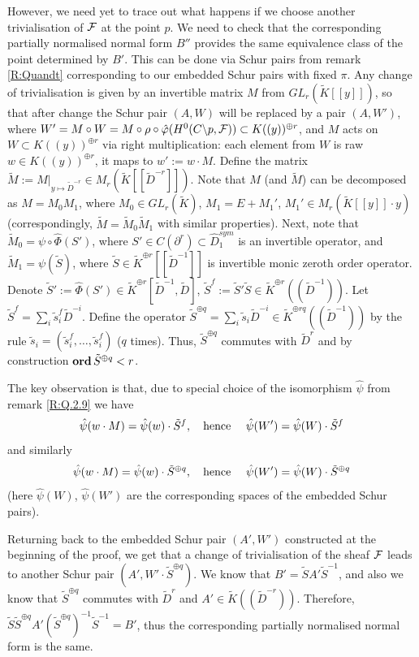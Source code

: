 \documentclass[11pt]{article}
\theoremstyle{definition}
\theoremstyle{plain}
\numberwithin{equation}{section}
\newcommand{\cf}{{{\cal F}}}
\newcommand{\Ord}{\mathop {\rm \bf ord}}
\begin{document}
However, we need yet to trace out what happens if we choose another trivialisation of $\cf$ at the point $p$. We need to check that the corresponding partially normalised normal form $B''$ provides the same equivalence class of the point determined by $B'$. This can be done via Schur pairs from remark \ref{R:Quandt} corresponding to our embedded Schur pairs with fixed $\pi$. Any change of trivialisation is given by an invertible matrix $M$ from $GL_r(\tilde{K}[[y]])$, so that after change the Schur pair $(A,W)$ will be replaced by a pair $(A,W')$, where $W'=M\circ W=M\circ\rho \circ \hat{\varphi} (H^0(C\backslash p,\cf ))\subset K((y))^{\oplus r}$, and $M$ acts on $W\subset K((y))^{\oplus r}$ via right multiplication: each element from $W$ is raw  $w\in K((y))^{\oplus r}$, it maps to $w':=w\cdot M$. 
Define the matrix $\tilde{M}:=M|_{y\mapsto \tilde{D}^{-r}}\in M_r(\tilde{K}[[\tilde{D}^{-r}]])$. Note that $M$ (and $\tilde{M}$) can be decomposed as $M=M_0M_1$, where $M_0\in GL_r(\tilde{K})$, $M_1=E+M_1'$, $M_1'\in M_r(\tilde{K}[[y]]\cdot y)$ (correspondingly, $\tilde{M}=\tilde{M}_0\tilde{M}_1$ with similar properties). Next, note that $\tilde{M}_0=\psi \circ \hat{\Phi} (S')$, where $S'\in C(\partial^r)\subset \hat{D}_1^{sym}$ is an invertible operator, and $\tilde{M}_1=\psi (\tilde{S})$, where 
$\tilde{S}\in \tilde{K}^{\oplus r}[[\tilde{D}^{-1}]]$ is invertible monic zeroth order operator. Denote $\tilde{S}':= \hat{\Phi} (S')\in \tilde{K}^{\oplus r}[\tilde{D}^{-1},\tilde{D}]$, $\tilde{S}^f:=\tilde{S}'\tilde{S}\in \tilde{K}^{\oplus r}((\tilde{D}^{-1}))$. Let $\tilde{S}^f=\sum_i\tilde{s}_i^f\tilde{D}^{-i}$. 
Define the operator $\tilde{S}^{\oplus q}=\sum_i\tilde{s}_i\tilde{D}^{-i} \in \tilde{K}^{\oplus rq}((\tilde{D}^{-1}))$ by the rule $\tilde{s}_i=(\tilde{s}_i^f,\ldots , \tilde{s}_i^f)$ ($q$ times). Thus, $\tilde{S}^{\oplus q}$ commutes with $\tilde{D}^r$ and by construction $\Ord \tilde{S}^{\oplus q}<r$. 

The key observation is that, due to special choice of the isomorphism $\hat{\psi}$ from remark \ref{R:Q.2.9} we have 
$$
\hat{\psi}(w\cdot M) = \hat{\psi}(w)\cdot \tilde{S}^{f}, \mbox{\quad hence \quad} \hat{\psi}(W')=\hat{\psi}(W)\cdot \tilde{S}^{f}
$$
and similarly 
$$
\hat{\psi}(w\cdot M) = \hat{\psi}(w)\cdot \tilde{S}^{\oplus q}, \mbox{\quad hence \quad} \hat{\psi}(W')=\hat{\psi}(W)\cdot \tilde{S}^{\oplus q}
$$  
(here $\hat{\psi}(W)$, $\hat{\psi}(W')$ are the corresponding spaces of the embedded Schur pairs).  

Returning back to the embedded Schur pair $(A', W')$ constructed at the beginning of the proof, we get that a change of trivialisation of the sheaf $\cf$ leads to another Schur pair $(A', W'\cdot \tilde{S}^{\oplus q})$. We know that $B'=\tilde{S}A'\tilde{S}^{-1}$, and also we know that $\tilde{S}^{\oplus q}$ commutes with $\tilde{D}^r$ and $A'\in \tilde{K}((\tilde{D}^{-r}))$. Therefore, $\tilde{S}\tilde{S}^{\oplus q}A'(\tilde{S}^{\oplus q})^{-1}\tilde{S}^{-1}=B'$, thus the corresponding partially normalised normal form is the same.
\end{document}
